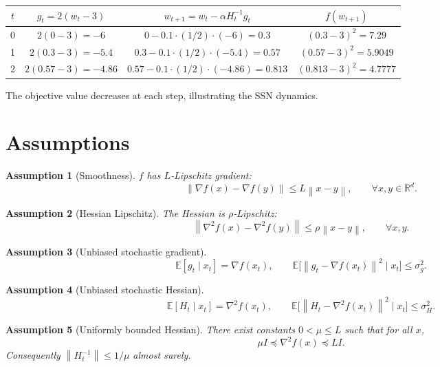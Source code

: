 \documentclass{article}
\newtheorem{assumption}{Assumption}
\newcommand{\E}{\mathbb{E}}
\newcommand{\norm}[1]{\left\|#1\right\|}
\newcommand{\grad}{\nabla}
\newcommand{\hess}{\nabla^{2}}
\begin{document}
\begin{center}
\begin{tabular}{c|c|c|c}
$t$ & $g_{t}=2(w_{t}-3)$ & $w_{t+1}=w_{t}-\alpha H_{t}^{-1}g_{t}$ & $f(w_{t+1})$\\ \hline
0 & $2(0-3)=-6$ & $0-0.1\cdot(1/2)\cdot(-6)=0.3$ & $(0.3-3)^{2}=7.29$\\
1 & $2(0.3-3)=-5.4$ & $0.3-0.1\cdot(1/2)\cdot(-5.4)=0.57$ & $(0.57-3)^{2}=5.9049$\\
2 & $2(0.57-3)=-4.86$ & $0.57-0.1\cdot(1/2)\cdot(-4.86)=0.813$ & $(0.813-3)^{2}=4.7777$\\
\end{tabular}
\end{center}
The objective value decreases at each step, illustrating the SSN dynamics.

\newpage
\section*{Assumptions}
\begin{assumption}[Smoothness]\label{ass:smooth}
$f$ has $L$‑Lipschitz gradient:
\[
\norm{\grad f(x)-\grad f(y)}\le L\norm{x-y},\qquad\forall x,y\in\mathbb{R}^{d}.
\]
\end{assumption}
\begin{assumption}[Hessian Lipschitz]\label{ass:hesslip}
The Hessian is $\rho$‑Lipschitz:
\[
\norm{\hess f(x)-\hess f(y)}\le\rho\norm{x-y},\qquad\forall x,y.
\]
\end{assumption}
\begin{assumption}[Unbiased stochastic gradient]\label{ass:gradunb}
\[
\E[g_{t}\mid x_{t}]=\grad f(x_{t}),\qquad
\E\big[\norm{g_{t}-\grad f(x_{t})}^{2}\mid x_{t}\big]\le\sigma_{g}^{2}.
\]
\end{assumption}
\begin{assumption}[Unbiased stochastic Hessian]\label{ass:hessunb}
\[
\E[H_{t}\mid x_{t}]=\hess f(x_{t}),\qquad
\E\big[\norm{H_{t}-\hess f(x_{t})}^{2}\mid x_{t}\big]\le\sigma_{H}^{2}.
\]
\end{assumption}
\begin{assumption}[Uniformly bounded Hessian]\label{ass:hessbound}
There exist constants $0<\mu\le L$ such that for all $x$,
\[
\mu I\preceq \hess f(x)\preceq L I .
\]
Consequently $\norm{H_{t}^{-1}}\le 1/\mu$ almost surely.
\end{assumption}
\end{document}
